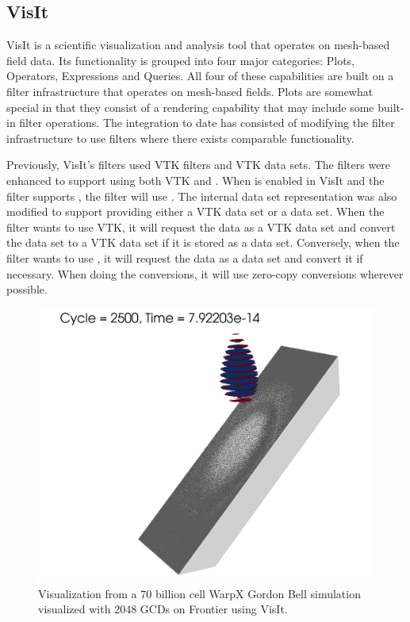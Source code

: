 \subsection{VisIt}

VisIt is a scientific visualization and analysis tool that operates on mesh-based field data.
Its functionality is grouped into four major categories: Plots, Operators, Expressions and Queries.
All four of these capabilities are built on a filter infrastructure that operates on mesh-based fields.
Plots are somewhat special in that they consist of a rendering capability that may include some built-in filter operations.
The \vtkm integration to date has consisted of modifying the filter infrastructure to use \vtkm filters where there exists comparable \vtkm functionality.


Previously, VisIt's filters used VTK filters and VTK data sets.
The filters were enhanced to support using both VTK and \vtkm.
When \vtkm is enabled in VisIt and the filter supports \vtkm, the filter will use \vtkm.
The internal data set representation was also modified to support providing either a VTK data set or a \vtkm data set.
When the filter wants to use VTK, it will request the data as a VTK data set and convert the data set to a VTK data set if it is stored as a \vtkm data set.
Conversely, when the filter wants to use \vtkm, it will request the data as a \vtkm data set and convert it if necessary.
When doing the conversions, it will use zero-copy conversions wherever possible.

\begin{figure}[htb]
  \includegraphics[width=\linewidth]{figures/visit_warpx_frontier.png}
  \caption{Visualization from a 70 billion cell WarpX Gordon Bell simulation~\cite{FedeliHuebl2022} visualized with 2048 GCDs on Frontier using VisIt.}
  \label{fig:visit_warpx_frontier}
\end{figure}

